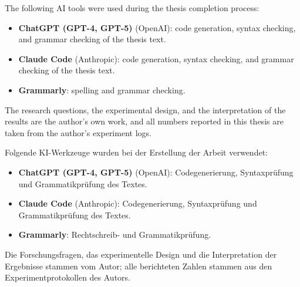 \documentclass[twoside]{vutinfth}
\begin{document}
\appendix


\backmatter

\begin{aitools}
    The following AI tools were used during the thesis completion process:

    \begin{itemize}
    	\item \textbf{ChatGPT (GPT-4, GPT-5)} (OpenAI): code generation, syntax checking, and grammar checking of the thesis text.
        \item \textbf{Claude Code} (Anthropic): code generation, syntax checking, and grammar checking of the thesis text.
        \item \textbf{Grammarly}: spelling and grammar checking.
    \end{itemize}

    The research questions, the experimental design, and the interpretation of the results are the author's own work, and all numbers reported in this thesis are taken from the author's experiment logs.
\end{aitools}

\begin{kitools}
    Folgende KI-Werkzeuge wurden bei der Erstellung der Arbeit verwendet:

    \begin{itemize}
        \item \textbf{ChatGPT (GPT-4, GPT-5)} (OpenAI): Codegenerierung, Syntaxprüfung und Grammatikprüfung des Textes.
        \item \textbf{Claude Code} (Anthropic): Codegenerierung, Syntaxprüfung und Grammatikprüfung des Textes.
        \item \textbf{Grammarly}: Rechtschreib- und Grammatikprüfung.
    \end{itemize}

    Die Forschungsfragen, das experimentelle Design und die Interpretation der Ergebnisse stammen vom Autor; alle berichteten Zahlen stammen aus den Experimentprotokollen des Autors.
\end{kitools}

\listoffigures %

\cleardoublepage %
\listoftables %

\listofalgorithms
{}

\printindex %

\printglossaries %



\end{document}
